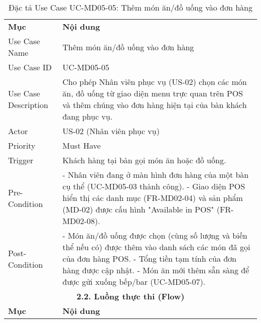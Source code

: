 \begin{longtable}{|m{4cm}|p{11cm}|}
\caption{Đặc tả Use Case UC-MD05-05: Thêm món ăn/đồ uống vào đơn hàng} \label{tab:uc_md05_05} \\
\hline

\endhead %
\hline
\endfoot %
\hline
\endlastfoot %
\multicolumn{2}{|c|}{\textbf{2.1. Tóm tắt (Summary)}} \\
\hline
\textbf{Mục} & \textbf{Nội dung} \\
\hline
Use Case Name & Thêm món ăn/đồ uống vào đơn hàng \\
\hline
Use Case ID & UC-MD05-05 \\
\hline
Use Case Description & Cho phép Nhân viên phục vụ (US-02) chọn các món ăn, đồ uống từ giao diện menu trực quan trên POS và thêm chúng vào đơn hàng hiện tại của bàn khách đang phục vụ. \\
\hline
Actor & US-02 (Nhân viên phục vụ) \\
\hline
Priority & Must Have \\
\hline
Trigger & Khách hàng tại bàn gọi món ăn hoặc đồ uống. \\
\hline
Pre-Condition & - Nhân viên đang ở màn hình đơn hàng của một bàn cụ thể (UC-MD05-03 thành công). \newline - Giao diện POS hiển thị các danh mục (FR-MD02-04) và sản phẩm (MD-02) được cấu hình "Available in POS" (FR-MD02-08). \\
\hline
Post-Condition & - Món ăn/đồ uống được chọn (cùng số lượng và biến thể nếu có) được thêm vào danh sách các món đã gọi của đơn hàng POS. \newline - Tổng tiền tạm tính của đơn hàng được cập nhật. \newline - Món ăn mới thêm sẵn sàng để được gửi xuống bếp/bar (UC-MD05-07). \\
\hline
\multicolumn{2}{|c|}{\textbf{2.2. Luồng thực thi (Flow)}} \\
\hline
\textbf{Mục} & \textbf{Nội dung} \\
\hline

\end{longtable}
